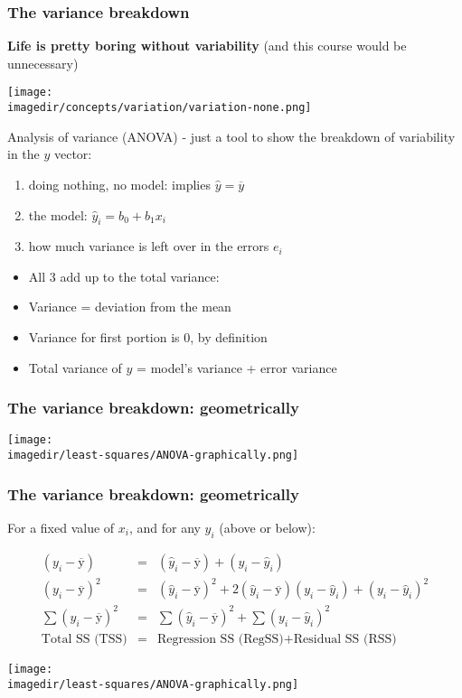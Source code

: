 \begin{frame}\frametitle{The variance breakdown}
	
	\textbf{Life is pretty boring without variability} (and this course would be unnecessary)
	\begin{center}
		\texttt{[image: \\imagedir/concepts/variation/variation-none.png]}
	\end{center}
	
	Analysis of variance (ANOVA) - just a tool to show the breakdown of variability in the $y$ vector: 
	\begin{enumerate}
		\item	doing nothing, no model: implies $\hat{y} = \overline{y}$ 
		\item	the model: $\hat{y}_i = b_0 + b_1 x_i$ 
		\item	how much variance is left over in the errors $e_i$ 
	\end{enumerate}
	\begin{itemize}
		\item	All 3 add up to the total variance: 
		\item	Variance = deviation from the mean 
		\item	Variance for first portion is 0, by definition 
		\item	Total variance of $y$ = model's variance + error variance 
	\end{itemize}
\end{frame}

\begin{frame}\frametitle{The variance breakdown: geometrically}
	\begin{center}
		\texttt{[image: \\imagedir/least-squares/ANOVA-graphically.png]}
	\end{center}
\end{frame}

\begin{frame}\frametitle{The variance breakdown: geometrically}
	
	For a fixed value of $x_i$, and for any $y_i$ (above or below):
	
	$$ 
	\begin{array}{rcl}
		(y_i - \overline{\mathrm{y}}) &=& (\hat{y}_i - \overline{\mathrm{y}}) + (y_i - \hat{y}_i) \\
		(y_i - \overline{\mathrm{y}})^2 &=& (\hat{y}_i - \overline{\mathrm{y}})^2 + 2(\hat{y}_i - \overline{\mathrm{y}})(y_i - \hat{y}_i) + (y_i - \hat{y}_i)^2 \\
		\sum{(y_i - \overline{\mathrm{y}})^2} &=& \sum{(\hat{y}_i - \overline{\mathrm{y}})^2} + \sum{(y_i - \hat{y}_i)^2} \\
		\text{Total SS (TSS)} &=& \text{Regression SS (RegSS)} + \text{Residual SS (RSS)} 
	\end{array}
	$$
	\begin{center}
		\texttt{[image: \\imagedir/least-squares/ANOVA-graphically.png]}
	\end{center}
\end{frame}

